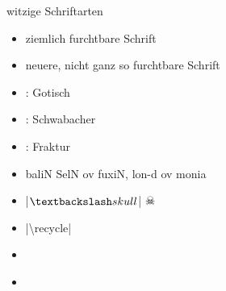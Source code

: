 \documentclass[
	vorläufig=false,
	datum=2022-12-22,
	titel={Witziges, Obskures und Sinnvolles…},
	web=false,
 	aspectratio=1610,
 	max,
]{../tex/latexkurs-slides}
\begin{document}
\begin{frame}{witzige Schriftarten}
	\begin{itemize}[<+->]
		\item {}\hfill{ ziemlich furchtbare Schrift}
		\item {}\hfill{\comicneue neuere, nicht ganz so furchtbare Schrift}
                \item {}: Gotisch\hfill{}
                \item {}: Schwabacher\hfill{}
                \item {}: Fraktur\hfill{}
		\item {}\hfill{\cirth baliN SelN ov fuxiN, lon-d ov monia}
		\item {}\hfill{|$\textbackslash skull$| \quad \Large \(\skull\)}
                \item {}\hfill{|\textbackslash recycle| \quad \small \recycle}
		\item {}\hfill{\Large{}}
		\vspace{-.8em}

		\item {}\hfill{}\hspace{-2ex}\,
	\end{itemize}
\end{frame}

\end{document}
